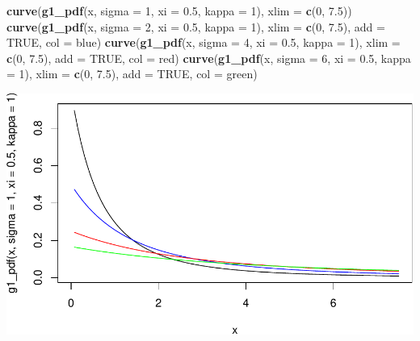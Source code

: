 \documentclass[
]{article}
\newenvironment{Shaded}{\begin{snugshade}}{\end{snugshade}}
\newcommand{\AttributeTok}[1]{\textcolor[rgb]{0.13,0.29,0.53}{#1}}
\newcommand{\ConstantTok}[1]{\textcolor[rgb]{0.56,0.35,0.01}{#1}}
\newcommand{\DecValTok}[1]{\textcolor[rgb]{0.00,0.00,0.81}{#1}}
\newcommand{\FloatTok}[1]{\textcolor[rgb]{0.00,0.00,0.81}{#1}}
\newcommand{\FunctionTok}[1]{\textcolor[rgb]{0.13,0.29,0.53}{\textbf{#1}}}
\newcommand{\NormalTok}[1]{#1}
\newcommand{\StringTok}[1]{\textcolor[rgb]{0.31,0.60,0.02}{#1}}
\begin{document}
\begin{Shaded}
\begin{Highlighting}[]
\FunctionTok{curve}\NormalTok{(}\FunctionTok{g1\_pdf}\NormalTok{(x, }\AttributeTok{sigma =} \DecValTok{1}\NormalTok{, }\AttributeTok{xi =} \FloatTok{0.5}\NormalTok{, }\AttributeTok{kappa =} \DecValTok{1}\NormalTok{), }\AttributeTok{xlim =} \FunctionTok{c}\NormalTok{(}\DecValTok{0}\NormalTok{, }\FloatTok{7.5}\NormalTok{))}
\FunctionTok{curve}\NormalTok{(}\FunctionTok{g1\_pdf}\NormalTok{(x, }\AttributeTok{sigma =} \DecValTok{2}\NormalTok{, }\AttributeTok{xi =} \FloatTok{0.5}\NormalTok{, }\AttributeTok{kappa =} \DecValTok{1}\NormalTok{), }\AttributeTok{xlim =} \FunctionTok{c}\NormalTok{(}\DecValTok{0}\NormalTok{, }\FloatTok{7.5}\NormalTok{), }\AttributeTok{add =} \ConstantTok{TRUE}\NormalTok{, }\AttributeTok{col =} \StringTok{\textquotesingle{}blue\textquotesingle{}}\NormalTok{)}
\FunctionTok{curve}\NormalTok{(}\FunctionTok{g1\_pdf}\NormalTok{(x, }\AttributeTok{sigma =} \DecValTok{4}\NormalTok{, }\AttributeTok{xi =} \FloatTok{0.5}\NormalTok{, }\AttributeTok{kappa =} \DecValTok{1}\NormalTok{), }\AttributeTok{xlim =} \FunctionTok{c}\NormalTok{(}\DecValTok{0}\NormalTok{, }\FloatTok{7.5}\NormalTok{), }\AttributeTok{add =} \ConstantTok{TRUE}\NormalTok{, }\AttributeTok{col =} \StringTok{\textquotesingle{}red\textquotesingle{}}\NormalTok{)}
\FunctionTok{curve}\NormalTok{(}\FunctionTok{g1\_pdf}\NormalTok{(x, }\AttributeTok{sigma =} \DecValTok{6}\NormalTok{, }\AttributeTok{xi =} \FloatTok{0.5}\NormalTok{, }\AttributeTok{kappa =} \DecValTok{1}\NormalTok{), }\AttributeTok{xlim =} \FunctionTok{c}\NormalTok{(}\DecValTok{0}\NormalTok{, }\FloatTok{7.5}\NormalTok{), }\AttributeTok{add =} \ConstantTok{TRUE}\NormalTok{, }\AttributeTok{col =} \StringTok{\textquotesingle{}green\textquotesingle{}}\NormalTok{)}
\end{Highlighting}
\end{Shaded}

\begin{center}\includegraphics[width=0.8\linewidth]{g1_varying_params_files/figure-latex/unnamed-chunk-4-1} \end{center}
\end{document}
